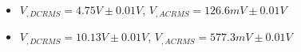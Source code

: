 \begin{itemize}
     \item $V_{, DCRMS}=4.75V\pm 0.01\unit{V}$, $V_{, ACRMS}=126.6mV\pm 0.01\unit{V}$ 
     \item $V_{, DCRMS}=10.13V\pm 0.01\unit{V}$, $V_{, ACRMS}=577.3mV\pm 0.01\unit{V}$\\
\end{itemize}